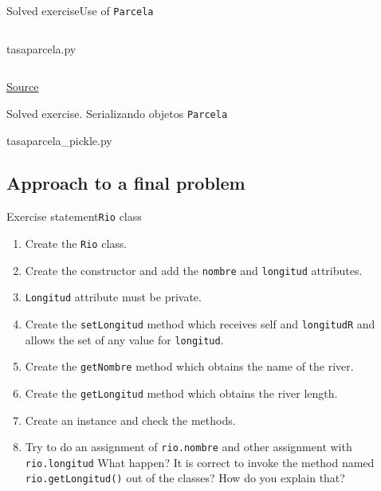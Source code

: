 \documentclass[10pt,compress]{beamer} %
\begin{document}
\begin{frame}{Solved exercise}{Use of \texttt{Parcela}}
	\vspace{-0.4cm}
    \begin{columns}
			\begin{block}{tasaparcela.py}
			\vspace{-0.3cm} 
			\vspace{-0.3cm} 
			\end{block}
	\end{columns}
		\tiny{\href{http://esripress.esri.com/display/index.cfm?fuseaction=display&websiteID=276&moduleID=0}{Source}}
\end{frame}

\begin{frame}[plain]{Solved exercise. Serializando objetos \texttt{Parcela}}{}
			\begin{block}{\footnotesize{tasaparcela\_pickle.py}}
			\vspace{-0.2cm} 
			\vspace{-0.2cm} 
			\end{block}
	
\end{frame}

\subsection{Approach to a final problem}
\begin{frame}{Exercise statement}{\texttt{Rio} class}
\vspace{-0.24cm}
	\begin{enumerate}
		\item Create the \texttt{Rio} class. 
		\item Create the constructor and add the \texttt{nombre} and \texttt{longitud} attributes.
		\item \texttt{Longitud} attribute must be private.
		\item Create the \texttt{setLongitud} method which receives self and \texttt{longitudR} and allows the set of any value for \texttt{longitud}.
		\item Create the \texttt{getNombre} method which obtains the name of the river.
		\item Create the \texttt{getLongitud} method which obtains the river length.		 
		\item Create an instance and check the methods.
		\item Try to do an assignment of \texttt{rio.nombre} and other assignment with  \texttt{rio.longitud} What happen? It is correct  to invoke the method named \texttt{rio.getLongitud()} out of the classes? How do you explain that?
	\end{enumerate}	
\end{frame}
\end{document}
